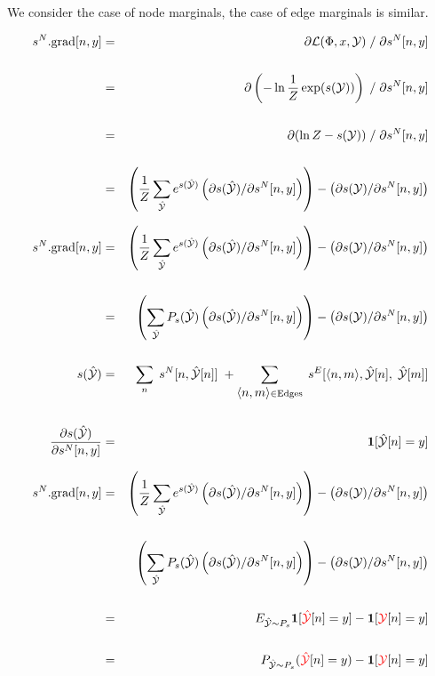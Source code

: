 {We consider the case of node marginals, the case of edge marginals is similar.

{\huge
\begin{eqnarray*}
    s^N.\mathrm{grad}[n,y] & = & \partial {\cal L}(\Phi,x,{\cal Y})\;/\;\partial s^N[n,y] \\
    \\
    & = & \partial \left(-\ln \frac{1}{Z}\exp(s({\cal Y}))\right)\;/\;\partial s^N[n,y] \\
    \\
    & = & \partial (\ln Z - s({\cal Y}))\;/\;\partial s^N[n,y] \\
    \\
    & = & \left(\frac{1}{Z} \sum_{\hat{\cal Y}} e^{s(\hat{\cal Y})} \left(\partial s(\hat{\cal Y})/\partial s^N[n,y]\right)\right)
    - \left(\partial s({\cal Y}) /\partial s^N[n,y]\right) 
\end{eqnarray*}
}


{\huge
\begin{eqnarray*}
    s^N.\mathrm{grad}[n,y] & = & \left(\frac{1}{Z} \sum_{\hat{\cal Y}} e^{s(\hat{\cal Y})} \left(\partial s(\hat{\cal Y})/\partial s^N[n,y]\right)\right)
    - \left(\partial s({\cal Y}) /\partial s^N[n,y]\right)  \\
    \\
    & = & \left(\sum_{\hat{\cal Y}} P_s(\hat{\cal Y}) \left(\partial s(\hat{\cal Y})/\partial s^N[n,y]\right)\right)
    - \left(\partial s({\cal Y}) /\partial s^N[n,y]\right)    \\
    \\
    s(\hat{\cal Y}) & = & \sum_n\;s^N[n,\hat{\cal Y}[n]]\; + \sum_{{\mbox{$\langle n,m\rangle$}} \in \mathrm{Edges}}\;s^E[{\mbox{$\langle n,m\rangle$}},\hat{\cal Y}[n],\;\hat{\cal Y}[m]] \\
    \\
    \frac{\partial s(\hat{\cal Y})}{\partial s^N[n,y]} & = & \mathbf{1}[\hat{\cal Y}[n] = y]
\end{eqnarray*}
}


\huge{
\begin{eqnarray*}
    s^N.\mathrm{grad}[n,y] & = & \left(\frac{1}{Z} \sum_{\hat{\cal Y}} e^{s(\hat{\cal Y})} \left(\partial s(\hat{\cal Y})/\partial s^N[n,y]\right)\right)
    - \left(\partial s({\cal Y}) /\partial s^N[n,y]\right)  \\
    \\
    & & \left(\sum_{\hat{\cal Y}} P_s(\hat{\cal Y}) \left(\partial s(\hat{\cal Y})/\partial s^N[n,y]\right)\right)
    - \left(\partial s({\cal Y}) /\partial s^N[n,y]\right)    \\
    \\
    & = & E_{\hat{\cal Y} \sim P_s}\mathbf{1}[{\color{red} \hat{\cal Y}}[n] = y]
    - \mathbf{1}[{\color{red}{\cal Y}}[n] = y] \\
    \\
    & = & P_{\hat{\cal Y} \sim P_s}({\color{red} \hat{\cal Y}}[n] = y)
      - \mathbf{1}[{\color{red}{\cal Y}}[n] = y]
\end{eqnarray*}
}

}

